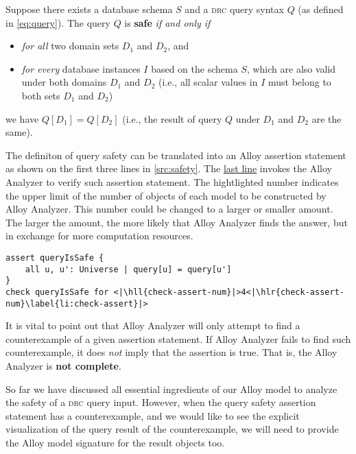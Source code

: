 \begin{definition}
    Suppose there exists a database schema $S$ and a \textsc{drc} query syntax $Q$ (as defined in \eqref{eq:query}). The query $Q$ is \textbf{safe} \emph{if and only if}
    \begin{itemize}[topsep=0.5pc,itemsep=0.25pc]
        \item  \textit{for all} two domain sets $D_1$ and $D_2$, and
        \item  \textit{for every} database instances $I$ based on the schema $S$, which are also valid under both domains $D_1$ and $D_2$ (i.e., all scalar values in $I$ must belong to both sets $D_1$ and $D_2$)
    \end{itemize}
    we have $Q[D_1] = Q[D_2]$ \;(i.e., the result of query $Q$ under $D_1$ and $D_2$ are the same).
\end{definition}

\smallskip
The definiton of query safety can be translated into an Alloy assertion statement as shown on the first three lines in \autoref{src:safety}. The \hyperref[li:check-assert]{last line} invokes the Alloy Analyzer to verify such assertion statement. The hightlighted number  indicates the upper limit of the number of objects of each model to be constructed by Alloy Analyzer. This number could be changed to a larger or smaller amount. The larger the amount, the more likely that Alloy Analyzer finds the answer, but in exchange for more computation resources.

\begin{lstlisting}[language=alloy,float={t},caption={Alloy assertion statement indicating that the \alloy{query} is true.},label={src:safety}]
assert queryIsSafe {
    all u, u': Universe | query[u] = query[u']
}
check queryIsSafe for <|\hll{check-assert-num}|>4<|\hlr{check-assert-num}\label{li:check-assert}|>
\end{lstlisting}

\begin{note}
    It is vital to point out that Alloy Analyzer will only attempt to find a counterexample of a given assertion statement. If Alloy Analyzer fails to find such counterexample, it does \emph{not} imply that the assertion is true. That is, the Alloy Analyzer is \textbf{not complete}.
\end{note}

\smallskip
So far we have discussed all essential ingredients of our Alloy model to analyze the safety of a \textsc{drc} query input. However, when the query safety assertion statement has a counterexample, and we would like to see the explicit visualization of the query result of the counterexample, we will need to provide the Alloy model signature for the result objects too.



